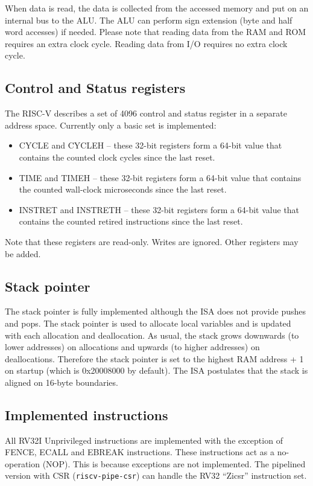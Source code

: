 \documentclass[12pt]{article}
\begin{document}
When data is read, the data is collected from the accessed memory and put on an internal bus to the ALU. The ALU can perform sign extension (byte and half word accesses) if needed. Please note that reading data from the RAM and ROM requires an extra clock cycle. Reading data from I/O requires no extra clock cycle.

\subsection{Control and Status registers}
The RISC-V describes a set of 4096 control and status register in a separate address space. Currently only a basic set is implemented:

\begin{itemize}
\item CYCLE and CYCLEH -- these 32-bit registers form a 64-bit value that contains the counted clock cycles since the last reset.
\item TIME and TIMEH -- these 32-bit registers form a 64-bit value that contains the counted wall-clock microseconds since the last reset.
\item INSTRET and INSTRETH -- these 32-bit registers form a 64-bit value that contains the counted retired instructions since the last reset.
\end{itemize}

Note that these registers are read-only. Writes are ignored. Other registers may be added.

\subsection{Stack pointer}
The stack pointer is fully implemented although the ISA does not provide pushes and pops. The stack pointer is used to allocate local variables and is updated with each allocation and deallocation. As usual, the stack grows downwards (to lower addresses) on allocations and upwards (to higher addresses) on deallocations. Therefore the stack pointer is set to the highest RAM address + 1 on startup (which is 0x20008000 by default). The ISA postulates that the stack is aligned on 16-byte boundaries.

\subsection{Implemented instructions}
All RV32I Unprivileged instructions are implemented with the exception of FENCE, ECALL and EBREAK instructions. These instructions act as a no-operation (NOP). This is because exceptions are not implemented. The pipelined version with CSR (\texttt{riscv-pipe-csr}) can handle the RV32 ``Zicsr'' instruction set.
\end{document}
